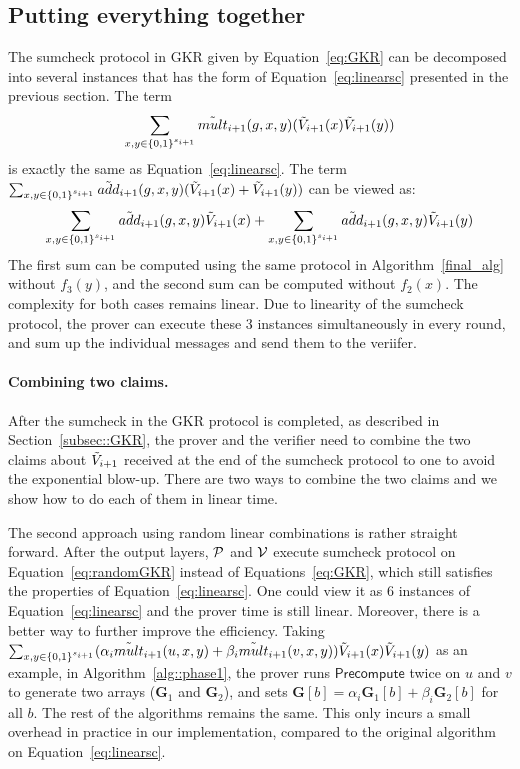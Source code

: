 {{\subsection{Putting everything together}

The sumcheck protocol in GKR given by Equation~\ref{eq:GKR} can be decomposed into several instances that has the form of Equation~\ref{eq:linearsc} presented in the previous section. The term $$\sum_{x,y\in\binary^{s_{i+1}}}\tmult_{i+1}(g,x,y)(\tV_{i+1}(x)\tV_{i+1}(y))$$ is exactly the same as Equation~\ref{eq:linearsc}.  The term $\sum_{x,y\in\binary^{s_{i+1}}}\tadd_{i+1}(g,x,y)(\tV_{i+1}(x)+\tV_{i+1}(y))$ can be viewed as: 
\[
\sum_{x,y\in\binary^{s_{i+1}}}\tadd_{i+1}(g,x,y)\tV_{i+1}(x)+\sum_{x,y\in\binary^{s_{i+1}}}\tadd_{i+1}(g,x,y)\tV_{i+1}(y)
\]
The first sum can be computed using the same protocol in Algorithm~\ref{final_alg} without $f_3(y)$, and the second sum can be computed without $f_2(x)$. The complexity for both cases remains linear. Due to linearity of the sumcheck protocol, the prover can execute these 3 instances simultaneously in every round, and sum up the individual messages and send them to the veriifer.



\paragraph{Combining two claims.} After the sumcheck in the GKR protocol is completed, as described in Section~\ref{subsec::GKR}, the prover and the verifier need to combine the two claims about $\tV_{i+1}$ received at the end of the sumcheck protocol to one to avoid the exponential blow-up. There are two ways to combine the two claims and we show how to do each of them in linear time. 

The second approach using random linear combinations is rather straight forward. After the output layers, $\P$ and $\V$ execute sumcheck protocol on Equation~\ref{eq:randomGKR} instead of Equations~\ref{eq:GKR}, which still satisfies the properties of Equation~\ref{eq:linearsc}. One could view it as 6 instances of Equation~\ref{eq:linearsc} and the prover time is still linear. Moreover, there is a better way to further improve the efficiency. Taking $\sum_{x, y \in\binary^{s_{i+1}}}(\alpha_i\tmult_{i+1}(u,x,y)+\beta_i\tmult_{i+1}(v,x,y))\tV_{i+1}(x)\tV_{i+1}(y)$ as an example, in Algorithm~\ref{alg::phase1}, the prover runs $\mathsf{Precompute}$ twice on $u$ and $v$ to generate two arrays ($\textbf{G}_1$ and $\textbf{G}_2$), and sets $\textbf{G}[b]=\alpha_i \textbf{G}_1[b] + \beta_i\textbf{G}_2[b]$ for all $b$. The rest of the algorithms remains the same. This only incurs a small overhead in practice in our implementation, compared to the original algorithm on Equation~\ref{eq:linearsc}.

}}
